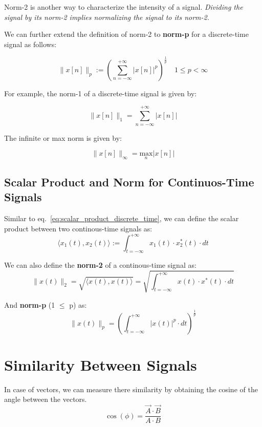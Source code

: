 \documentclass[letterpaper,12pt]{article}
\begin{document}
Norm-2 is another way to characterize the intensity of a signal.\textit{
    Dividing the signal by its norm-2 implies normalizing the signal to its
    norm-2.}

We can further extend the definition of norm-2 to \textbf{norm-p} for a
discrete-time signal as follows:

\begin{equation}
    \label{eq:norm_p_discrete_time}
    \| x[n] \|_p := {(\sum_{n=-\infty}^{+\infty} |x[n]|^{p})}^{\frac{1}{p}} \quad 1 \leq p < \infty
\end{equation}

For example, the norm-1 of a discrete-time signal is given by:

\[\| x[n] \|_1 = \sum_{n=-\infty}^{+\infty} |x[n]| \]

The infinite or max norm is given by:

\[\| x[n] \|_\infty = \underset{n}{\text{max}} |x[n]| \]

\subsection{Scalar Product and Norm for Continuos-Time Signals}

Similar to eq.~\ref{eq:scalar_product_discrete_time}, we can define the scalar
product between two continous-time signals as:
\begin{equation}
    \label{eq:scalar_product_cont_time}
    \langle x_{1}(t), x_{2}(t) \rangle := \int_{t=-\infty}^{+\infty} x_{1}(t) \cdot x_{2}^{*}(t) \cdot dt
\end{equation}

We can also define the \textbf{norm-2} of a continous-time signal as:
\begin{equation}
    \label{eq:norm_2_cont_time}
    \| x(t) \|_2 = \sqrt{\langle x(t), x(t) \rangle} = \sqrt{\int_{t=-\infty}^{+\infty} x(t) \cdot x^{*}(t) \cdot dt}
\end{equation}

And \textbf{norm-p} (1 $\leq$ p) as:
\begin{equation}
    \label{eq:norm_p_cont_time}
    \| x(t) \|_p = {(\int_{t=-\infty}^{+\infty} |x(t)|^{p} \cdot dt)}^{\frac{1}{p}}
\end{equation}

\section{Similarity Between Signals}
In case of vectors, we can measure there similarity by obtaining the cosine of
the angle between the vectors.
\[\cos(\phi) = \frac{\Vec{A} \cdot \Vec{B}}{A \cdot B}\]
\end{document}
